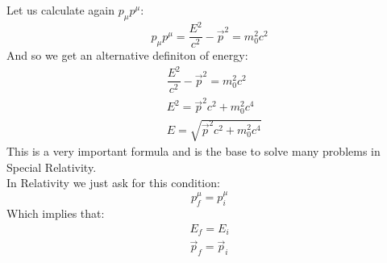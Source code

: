 Let us calculate again $p_{\mu}p^{\mu}$:
\begin{equation}
  p_{\mu}p^{\mu} = \dfrac{E^2}{c^2} - \vec{p}^2 = m_0^2c^2
\end{equation}
And so we get an alternative definiton of energy:
\begin{equation}
  \begin{split}
    &\dfrac{E^2}{c^2} - \vec{p}^2 = m_0^2c^2 \\[8pt]
    &E^2 = \vec{p}^2c^2 + m_0^2c^4 \\[8pt]
    &E = \sqrt{\vec{p}^2c^2 + m_0^2c^4}
  \end{split}
\end{equation}
This is a very important formula and is the base to solve many problems in Special Relativity.\\
In Relativity we just ask for this condition:
\begin{equation}
  p^{\mu}_f = p^{\mu}_i
\end{equation}
Which implies that:
\begin{equation}
  \begin{split}
    E_f = E_i \\[8pt]
    \vec{p}_f = \vec{p}_i
  \end{split}
\end{equation}

